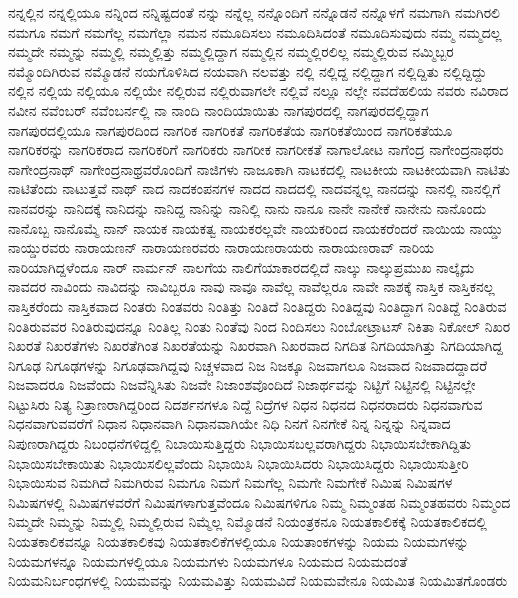 {ನನ್ನಲ್ಲಿನ
ನನ್ನಲ್ಲಿಯೂ
ನನ್ನಿಂದ
ನನ್ನಿಷ್ಟದಂತೆ
ನನ್ನು
ನನ್ನೆಲ್ಲ
ನನ್ನೊಂದಿಗೆ
ನನ್ನೊಡನೆ
ನನ್ನೊಳಗೆ
ನಮಗಾಗಿ
ನಮಗಿರಲಿ
ನಮಗೂ
ನಮಗೆ
ನಮಗೆಲ್ಲ
ನಮಗೆಲ್ಲಾ
ನಮನ
ನಮೂದಿಸಲು
ನಮೂದಿಸಿದಂತೆ
ನಮೂದಿಸುವುದು
ನಮ್ಮ
ನಮ್ಮದಲ್ಲ
ನಮ್ಮದೇ
ನಮ್ಮನ್ನು
ನಮ್ಮಲ್ಲಿ
ನಮ್ಮಲ್ಲಿತ್ತು
ನಮ್ಮಲ್ಲಿದ್ದಾಗ
ನಮ್ಮಲ್ಲಿನ
ನಮ್ಮಲ್ಲಿರಲಿಲ್ಲ
ನಮ್ಮಲ್ಲಿರುವ
ನಮ್ಮಿಬ್ಬರ
ನಮ್ಮೊಂದಿಗಿರುವ
ನಮ್ಮೊಡನೆ
ನಯಗೊಳಿಸಿದ
ನಯವಾಗಿ
ನಲವತ್ತು
ನಲ್ಲಿ
ನಲ್ಲಿದ್ದ
ನಲ್ಲಿದ್ದಾಗ
ನಲ್ಲಿದ್ದಿತು
ನಲ್ಲಿದ್ದಿದ್ದು
ನಲ್ಲಿನ
ನಲ್ಲಿಯ
ನಲ್ಲಿಯೂ
ನಲ್ಲಿಯೇ
ನಲ್ಲಿರುವ
ನಲ್ಲಿರುವಾಗಲೇ
ನಲ್ಲಿವೆ
ನಲ್ಲೂ
ನಲ್ಲೇ
ನವದೆಹಲಿಯ
ನವರು
ನವಿರಾದ
ನವೀನ
ನವೆಂಬರ್
ನವೆಂಬರ್ನಲ್ಲಿ
ನಾ
ನಾಂದಿ
ನಾಂದಿಯಾಯಿತು
ನಾಗಪುರದಲ್ಲಿ
ನಾಗಪುರದಲ್ಲಿದ್ದಾಗ
ನಾಗಪುರದಲ್ಲಿಯೂ
ನಾಗಪುರದಿಂದ
ನಾಗರಿಕ
ನಾಗರಿಕತೆ
ನಾಗರಿಕತೆಯ
ನಾಗರಿಕತೆಯಿಂದ
ನಾಗರಿಕತೆಯೂ
ನಾಗರಿಕರನ್ನು
ನಾಗರಿಕರಾದ
ನಾಗರಿಕರಿಗೆ
ನಾಗರಿಕರು
ನಾಗರೀಕ
ನಾಗರೀಕತೆ
ನಾಗಾಲೋಟ
ನಾಗೆಂದ್ರ
ನಾಗೇಂದ್ರನಾಥರು
ನಾಗೇಂದ್ರನಾಥ್
ನಾಗೇಂದ್ರನಾಥ್ರವರೊಂದಿಗೆ
ನಾಜಿಗಳು
ನಾಜೂಕಾಗಿ
ನಾಟಕದಲ್ಲಿ
ನಾಟಕೀಯ
ನಾಟಕೀಯವಾಗಿ
ನಾಟಿತು
ನಾಟಿತೆಂದು
ನಾಟುತ್ತವೆ
ನಾಥ್
ನಾದ
ನಾದಕಂಪನಗಳ
ನಾದದ
ನಾದದಲ್ಲಿ
ನಾದವನ್ನಲ್ಲ
ನಾನದನ್ನು
ನಾನಲ್ಲಿ
ನಾನಲ್ಲಿಗೆ
ನಾನವರನ್ನು
ನಾನಿದಕ್ಕೆ
ನಾನಿದನ್ನು
ನಾನಿದ್ದ
ನಾನಿನ್ನು
ನಾನಿಲ್ಲಿ
ನಾನು
ನಾನೂ
ನಾನೇ
ನಾನೇಕೆ
ನಾನೇನು
ನಾನೊಂದು
ನಾನೊಬ್ಬ
ನಾನೊಮ್ಮೆ
ನಾನ್
ನಾಯಕ
ನಾಯಕತ್ವ
ನಾಯಕರಲ್ಲವೇ
ನಾಯಕರಿಂದ
ನಾಯಕರೆಂದರೆ
ನಾಯಿಯ
ನಾಯ್ಡು
ನಾಯ್ಡುರವರು
ನಾರಾಯಣನ್
ನಾರಾಯಣರವರು
ನಾರಾಯಣರಾಯರು
ನಾರಾಯಣರಾವ್
ನಾರಿಯ
ನಾರಿಯಾಗಿದ್ದಳೆಂದೂ
ನಾರ್
ನಾರ್ಮನ್
ನಾಲಗೆಯ
ನಾಲಿಗೆಯಾಕಾರದಲ್ಲಿದೆ
ನಾಲ್ಕು
ನಾಲ್ಕುಪ್ರಮುಖ
ನಾಲ್ಕೈದು
ನಾವದರ
ನಾವಿಂದು
ನಾವಿದನ್ನು
ನಾವಿಬ್ಬರೂ
ನಾವು
ನಾವೂ
ನಾವೆಲ್ಲ
ನಾವೆಲ್ಲರೂ
ನಾವೇ
ನಾಶಕ್ಕೆ
ನಾಸ್ತಿಕ
ನಾಸ್ತಿಕನಲ್ಲ
ನಾಸ್ತಿಕರೆಂದು
ನಾಸ್ತಿಕವಾದ
ನಿಂತರು
ನಿಂತವರು
ನಿಂತಿತ್ತು
ನಿಂತಿದೆ
ನಿಂತಿದ್ದರು
ನಿಂತಿದ್ದವು
ನಿಂತಿದ್ದಾಗ
ನಿಂತಿದ್ದೆ
ನಿಂತಿರುವ
ನಿಂತಿರುವವರ
ನಿಂತಿರುವುದನ್ನೂ
ನಿಂತಿಲ್ಲ
ನಿಂತು
ನಿಂತೆವು
ನಿಂದ
ನಿಂದಿಸಲು
ನಿಂಬೋಟ್ರಾಟಸ್
ನಿಕಿತಾ
ನಿಕೋಲ್
ನಿಖರ
ನಿಖರತೆ
ನಿಖರತೆಗಳು
ನಿಖರತೆಗಿಂತ
ನಿಖರತೆಯನ್ನು
ನಿಖರವಾಗಿ
ನಿಖರವಾದ
ನಿಗದಿತ
ನಿಗದಿಯಾಗಿತ್ತು
ನಿಗದಿಯಾಗಿದ್ದ
ನಿಗೂಢ
ನಿಗೂಢಗಳನ್ನು
ನಿಗೂಢವಾಗಿದ್ದವು
ನಿಚ್ಚಳವಾದ
ನಿಜ
ನಿಜಕ್ಕೂ
ನಿಜವಾಗಲೂ
ನಿಜವಾದ
ನಿಜವಾದದ್ದಾದರೆ
ನಿಜವಾದರೂ
ನಿಜವೆಂದು
ನಿಜವೆನ್ನಿಸಿತು
ನಿಜವೇ
ನಿಜಾಂಶವೊಂದಿದೆ
ನಿಜಾರ್ಥವನ್ನು
ನಿಟ್ಟಿಗೆ
ನಿಟ್ಟಿನಲ್ಲಿ
ನಿಟ್ಟಿನಲ್ಲೇ
ನಿಟ್ಟುಸಿರು
ನಿತ್ಯ
ನಿತ್ರಾಣರಾಗಿದ್ದರಿಂದ
ನಿದರ್ಶನಗಳೂ
ನಿದ್ದೆ
ನಿದ್ರೆಗಳ
ನಿಧನ
ನಿಧನದ
ನಿಧನರಾದರು
ನಿಧನವಾಗುವ
ನಿಧನವಾಗುವವರೆಗೆ
ನಿಧಾನ
ನಿಧಾನವಾಗಿ
ನಿಧಾನವಾಗಿಯೇ
ನಿಧಿ
ನಿನಗೆ
ನಿನಗೇಕೆ
ನಿನ್ನ
ನಿನ್ನನ್ನು
ನಿನ್ನವಾದ
ನಿಪುಣರಾಗಿದ್ದರು
ನಿಬಂಧನೆಗಳಿದ್ದಲ್ಲಿ
ನಿಬಾಯಿಸುತ್ತಿದ್ದರು
ನಿಭಾಯಿಸಬಲ್ಲವರಾಗಿದ್ದರು
ನಿಭಾಯಿಸಬೇಕಾಗಿದ್ದಿತು
ನಿಭಾಯಿಸಬೇಕಾಯಿತು
ನಿಭಾಯಿಸಲಿಲ್ಲವೆಂದು
ನಿಭಾಯಿಸಿ
ನಿಭಾಯಿಸಿದರು
ನಿಭಾಯಿಸಿದ್ದರು
ನಿಭಾಯಿಸುತ್ತೀರಿ
ನಿಭಾಯಿಸುವ
ನಿಮಗಿದೆ
ನಿಮಗಿರುವ
ನಿಮಗೂ
ನಿಮಗೆ
ನಿಮಗೆಲ್ಲ
ನಿಮಗೇ
ನಿಮಗೇಕೆ
ನಿಮಿಷ
ನಿಮಿಷಗಳ
ನಿಮಿಷಗಳಲ್ಲಿ
ನಿಮಿಷಗಳವರೆಗೆ
ನಿಮಿಷಗಳಾಗುತ್ತವೆಂದೂ
ನಿಮಿಷಗಳಿಗೂ
ನಿಮ್ಮ
ನಿಮ್ಮಂತಹ
ನಿಮ್ಮಂತಹವರು
ನಿಮ್ಮಂದ
ನಿಮ್ಮದೇ
ನಿಮ್ಮನ್ನು
ನಿಮ್ಮಲ್ಲಿ
ನಿಮ್ಮಲ್ಲಿರುವ
ನಿಮ್ಮೆಲ್ಲ
ನಿಮ್ಮೊಡನೆ
ನಿಯಂತ್ರಕನೂ
ನಿಯತಕಾಲಿಕಕ್ಕೆ
ನಿಯತಕಾಲಿಕದಲ್ಲಿ
ನಿಯತಕಾಲಿಕವನ್ನೂ
ನಿಯತಕಾಲಿಕವು
ನಿಯತಕಾಲಿಕೆಗಳಲ್ಲಿಯೂ
ನಿಯತಾಂಕಗಳನ್ನು
ನಿಯಮ
ನಿಯಮಗಳನ್ನು
ನಿಯಮಗಳನ್ನೂ
ನಿಯಮಗಳಲ್ಲಿಯೂ
ನಿಯಮಗಳು
ನಿಯಮಗಳೂ
ನಿಯಮದ
ನಿಯಮದಂತೆ
ನಿಯಮನಿರ್ಬಂಧಗಳಲ್ಲಿ
ನಿಯಮವನ್ನು
ನಿಯಮವಿತ್ತು
ನಿಯಮವಿದೆ
ನಿಯಮವೇನೂ
ನಿಯಮಿತ
ನಿಯಮಿತಗೊಂಡರು
}
